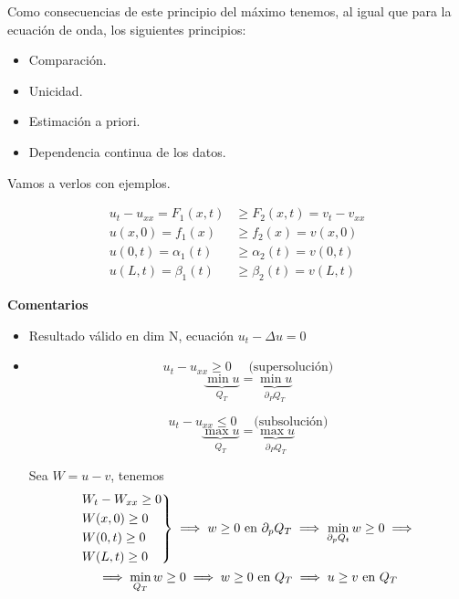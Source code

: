 	 Como consecuencias de este principio del máximo tenemos, al igual que para la ecuación de onda, los siguientes principios:
	 \begin{itemize}[itemsep = 0pt]
		\item Comparación.
		\item Unicidad.
		\item Estimación a priori.
		\item Dependencia continua de los datos.

	 \end{itemize}

	 Vamos a verlos con ejemplos.

	 \begin{example}[Comparación]
		\begin{align*}
			u_t - u_{xx} = F_1(x,t) &\geq F_2(x,t) = v_t - v_{xx} \\
			u(x,0) = f_1(x) &\geq f_2(x) = v(x,0) \\
			u(0,t) = \alpha_1(t) &\geq \alpha_2(t) = v(0,t)\\
			u(L,t) = \beta_1(t) &\geq \beta_2(t) = v(L,t)
		\end{align*}

		\textbf{Comentarios}
		\begin{itemize}
			\item Resultado válido en dim N, ecuación $u_t - \Delta u = 0$
			\item \[u_t - u_{xx} \geq 0 \quad\text{ (supersolución)}\]
				\[ \underbrace{\min u}_{Q_T} = \underbrace{\min u}_{\partial_P Q_T} \]

				\[u_t - u_{xx} \leq 0 \quad\text{ (subsolución)}\]
				\[ \underbrace{\max u}_{Q_T} = \underbrace{\max u}_{\partial_P Q_T} \]

				Sea $W = u-v$, tenemos
				\begin{gather*}
				\begin{rcases}
					W_t - W_{xx} \geq 0\\
					W(x,0) \geq 0 \\
					W(0,t) \geq 0 \\
					W(L,t) \geq 0
				\end{rcases}
				\implies w \geq 0 \text{ en } \partial_p Q_T \implies \min\limits_{\partial_p Q_t} w \geq 0 \implies\\
				\implies \min\limits_{Q_T} w \geq 0 \implies w \geq 0 \text{ en } Q_T \implies u \geq v \text{ en } Q_T
				\end{gather*}
		\end{itemize}

	 \end{example}

